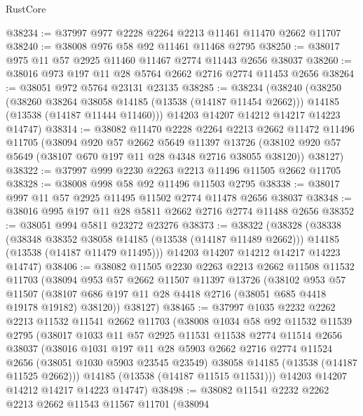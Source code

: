 \begin{lexlean}{RustCore}
\begin{coremodule}
@38234 := @37997 @977 @2228 @2264 @2213 @11461 @11470 @2662 @11707
@38240 := @38008 @976 @58 @92 @11461 @11468 @2795
@38250 := @38017 @975 @11 @57 @2925 @11460 @11467 @2774 @11443 @2656 @38037
@38260 := @38016 @973 @197 @11 @28 @5764 @2662 @2716 @2774 @11453 @2656
@38264 := @38051 @972 @5764 @23131 @23135
@38285 := @38234
    (@38240
      (@38250
        (@38260 @38264 @38058 @14185 (@13538 (@14187 @11454 @2662)))
        @14185
        (@13538 (@14187 @11444 @11460)))
      @14203
      @14207
      @14212
      @14217
      @14223
      @14747)
@38314 := @38082
    @11470
    @2228
    @2264
    @2213
    @2662
    @11472
    @11496
    @11705
    (@38094
      @920
      @57
      @2662
      @5649
      @11397
      @13726
      (@38102 @920 @57 @5649 (@38107 @670 @197 @11 @28 @4348 @2716 @38055 @38120))
      @38127)
@38322 := @37997 @999 @2230 @2263 @2213 @11496 @11505 @2662 @11705
@38328 := @38008 @998 @58 @92 @11496 @11503 @2795
@38338 := @38017 @997 @11 @57 @2925 @11495 @11502 @2774 @11478 @2656 @38037
@38348 := @38016 @995 @197 @11 @28 @5811 @2662 @2716 @2774 @11488 @2656
@38352 := @38051 @994 @5811 @23272 @23276
@38373 := @38322
    (@38328
      (@38338
        (@38348 @38352 @38058 @14185 (@13538 (@14187 @11489 @2662)))
        @14185
        (@13538 (@14187 @11479 @11495)))
      @14203
      @14207
      @14212
      @14217
      @14223
      @14747)
@38406 := @38082
    @11505
    @2230
    @2263
    @2213
    @2662
    @11508
    @11532
    @11703
    (@38094
      @953
      @57
      @2662
      @11507
      @11397
      @13726
      (@38102
        @953
        @57
        @11507
        (@38107 @686 @197 @11 @28 @4418 @2716 (@38051 @685 @4418 @19178 @19182) @38120))
      @38127)
@38465 := @37997
    @1035
    @2232
    @2262
    @2213
    @11532
    @11541
    @2662
    @11703
    (@38008
      @1034
      @58
      @92
      @11532
      @11539
      @2795
      (@38017
        @1033
        @11
        @57
        @2925
        @11531
        @11538
        @2774
        @11514
        @2656
        @38037
        (@38016
          @1031
          @197
          @11
          @28
          @5903
          @2662
          @2716
          @2774
          @11524
          @2656
          (@38051 @1030 @5903 @23545 @23549)
          @38058
          @14185
          (@13538 (@14187 @11525 @2662)))
        @14185
        (@13538 (@14187 @11515 @11531)))
      @14203
      @14207
      @14212
      @14217
      @14223
      @14747)
@38498 := @38082
    @11541
    @2232
    @2262
    @2213
    @2662
    @11543
    @11567
    @11701
    (@38094

\end{coremodule}
\end{lexlean}
